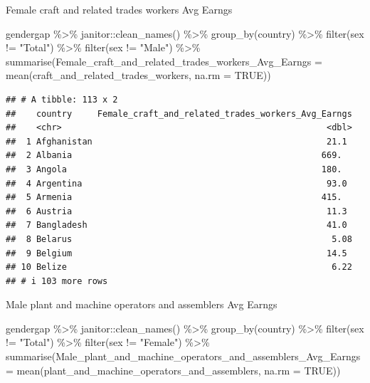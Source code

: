 \documentclass[
]{article}
\newenvironment{Shaded}{\begin{snugshade}}{\end{snugshade}}
\newcommand{\AttributeTok}[1]{\textcolor[rgb]{0.77,0.63,0.00}{#1}}
\newcommand{\ConstantTok}[1]{\textcolor[rgb]{0.00,0.00,0.00}{#1}}
\newcommand{\FunctionTok}[1]{\textcolor[rgb]{0.00,0.00,0.00}{#1}}
\newcommand{\NormalTok}[1]{#1}
\newcommand{\SpecialCharTok}[1]{\textcolor[rgb]{0.00,0.00,0.00}{#1}}
\newcommand{\StringTok}[1]{\textcolor[rgb]{0.31,0.60,0.02}{#1}}
\begin{document}
Female craft and related trades workers Avg Earngs

\begin{Shaded}
\begin{Highlighting}[]
\NormalTok{gendergap }\SpecialCharTok{\%\textgreater{}\%}
\NormalTok{  janitor}\SpecialCharTok{::}\FunctionTok{clean\_names}\NormalTok{() }\SpecialCharTok{\%\textgreater{}\%}
  \FunctionTok{group\_by}\NormalTok{(country) }\SpecialCharTok{\%\textgreater{}\%} 
   \FunctionTok{filter}\NormalTok{(sex }\SpecialCharTok{!=} \StringTok{"Total"}\NormalTok{) }\SpecialCharTok{\%\textgreater{}\%}
  \FunctionTok{filter}\NormalTok{(sex }\SpecialCharTok{!=} \StringTok{"Male"}\NormalTok{) }\SpecialCharTok{\%\textgreater{}\%}
  \FunctionTok{summarise}\NormalTok{(}\AttributeTok{Female\_craft\_and\_related\_trades\_workers\_Avg\_Earngs =} \FunctionTok{mean}\NormalTok{(craft\_and\_related\_trades\_workers, }\AttributeTok{na.rm =} \ConstantTok{TRUE}\NormalTok{))}
\end{Highlighting}
\end{Shaded}

\begin{verbatim}
## # A tibble: 113 x 2
##    country     Female_craft_and_related_trades_workers_Avg_Earngs
##    <chr>                                                    <dbl>
##  1 Afghanistan                                              21.1 
##  2 Albania                                                 669.  
##  3 Angola                                                  180.  
##  4 Argentina                                                93.0 
##  5 Armenia                                                 415.  
##  6 Austria                                                  11.3 
##  7 Bangladesh                                               41.0 
##  8 Belarus                                                   5.08
##  9 Belgium                                                  14.5 
## 10 Belize                                                    6.22
## # i 103 more rows
\end{verbatim}

Male plant and machine operators and assemblers Avg Earngs

\begin{Shaded}
\begin{Highlighting}[]
\NormalTok{gendergap }\SpecialCharTok{\%\textgreater{}\%}
\NormalTok{  janitor}\SpecialCharTok{::}\FunctionTok{clean\_names}\NormalTok{() }\SpecialCharTok{\%\textgreater{}\%}
  \FunctionTok{group\_by}\NormalTok{(country) }\SpecialCharTok{\%\textgreater{}\%} 
   \FunctionTok{filter}\NormalTok{(sex }\SpecialCharTok{!=} \StringTok{"Total"}\NormalTok{) }\SpecialCharTok{\%\textgreater{}\%}
  \FunctionTok{filter}\NormalTok{(sex }\SpecialCharTok{!=} \StringTok{"Female"}\NormalTok{) }\SpecialCharTok{\%\textgreater{}\%}
  \FunctionTok{summarise}\NormalTok{(}\AttributeTok{Male\_plant\_and\_machine\_operators\_and\_assemblers\_Avg\_Earngs =} \FunctionTok{mean}\NormalTok{(plant\_and\_machine\_operators\_and\_assemblers, }\AttributeTok{na.rm =} \ConstantTok{TRUE}\NormalTok{))}
\end{Highlighting}
\end{Shaded}
\end{document}

